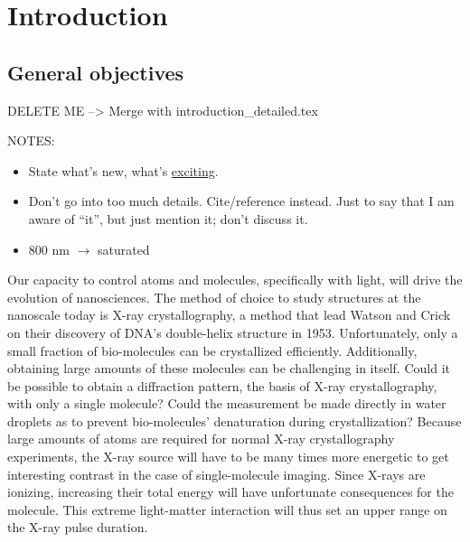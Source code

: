 \section{Introduction}


\subsection{General objectives}

DELETE ME --> Merge with introduction_detailed.tex


NOTES:
\begin{itemize}
\item State what's new, what's \underline{exciting}.
\item Don't go into too much details. Cite/reference instead. Just to say that
I am aware of ``it'', but just mention it; don't discuss it.
\item 800 nm $\rightarrow$ saturated
\end{itemize}

Our capacity to control atoms and molecules, specifically with light,
will drive the evolution of nanosciences. The method of choice to study
structures at the nanoscale today is X-ray crystallography, a method that lead
Watson and Crick on their discovery of DNA's double-helix structure in 1953.
Unfortunately, only a small fraction of bio-molecules can be crystallized
efficiently\citeneeded. Additionally, obtaining large amounts of these
molecules can be challenging in itself\cite{Young2010}. Could it be
possible to obtain a diffraction pattern,
the basis of X-ray crystallography, with only a single  molecule? Could the
measurement be made directly in water droplets as to prevent bio-molecules'
denaturation during crystallization? Because large amounts of atoms are
required for normal X-ray crystallography experiments, the X-ray source will
have to be many times more energetic to get interesting contrast in the
case of single-molecule imaging. Since X-rays are ionizing, increasing their
total energy will have unfortunate consequences for the molecule. This
extreme light-matter interaction will thus set an upper range on the X-ray
pulse duration.

